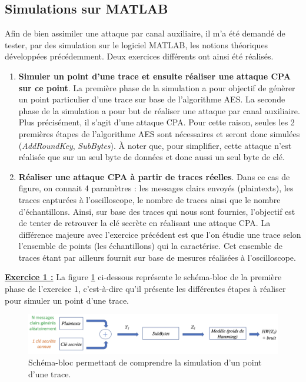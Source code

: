 \documentclass[10pt, oneside, a4paper]{article}
\begin{document}
\newpage

\subsection{Simulations sur MATLAB}

Afin de bien assimiler une attaque par canal auxiliaire, il m'a été demandé de tester, par des simulation sur le logiciel MATLAB, les notions théoriques développées précédemment. Deux exercices différents ont ainsi été réalisés. 
\begin{enumerate}
\item \textbf{Simuler un point d'une trace et ensuite réaliser une attaque CPA sur ce point}. La première phase de la simulation a pour objectif de génèrer un point particulier d'une trace sur base de l'algorithme AES. La seconde phase de la simulation a pour but de réaliser une attaque par canal auxiliaire. Plus précisément, il s'agit d'une attaque CPA. Pour cette raison, seules les 2 premières étapes de l'algorithme AES sont nécessaires et seront donc simulées (\textit{AddRoundKey}, \textit{SubBytes}). À noter que, pour simplifier, cette attaque n'est réalisée que sur un seul byte de données et donc aussi un seul byte de clé.
\item \textbf{Réaliser une attaque CPA à partir de traces réelles}. Dans ce cas de figure, on connait 4 paramètres : les messages clairs envoyés (plaintexts), les traces capturées à l'oscilloscope, le nombre de traces ainsi que le nombre d'échantillons. Ainsi, sur base des traces qui nous sont fournies, l'objectif est de tenter de retrouver la clé secrète en réalisant une attaque CPA. La différence majeure avec l'exercice précédent est que l'on étudie une trace selon l'ensemble de points (les échantillons) qui la caractérise. Cet ensemble de traces étant par ailleurs fournit sur base de mesures réalisées à l'oscilloscope. \\
\end{enumerate}

\hspace{-0.5 cm}\textbf{\underline{Exercice 1 :}} La figure \ref{fig:simul1} ci-dessous représente le schéma-bloc de la première phase de l'exercice 1, c'est-à-dire qu'il présente les différentes étapes à réaliser pour simuler un point d'une trace.
\begin{figure}[htbp]
    \centering
    \includegraphics[scale=0.45]{image/simul1}
    \caption{Schéma-bloc permettant de comprendre la simulation d'un point d'une trace.}
    \label{fig:simul1} 
\end{figure}
\end{document}
